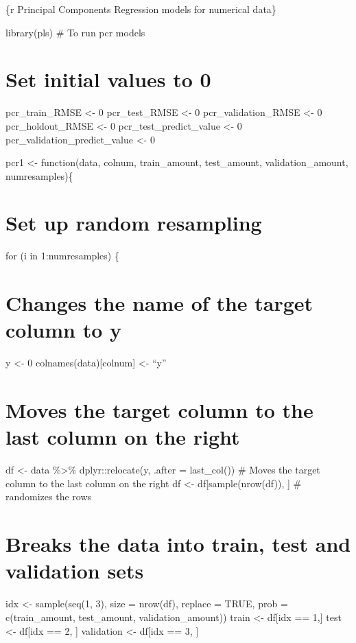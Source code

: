 \documentclass[
]{book}
\begin{document}
\{r Principal Components Regression models for numerical data\}

library(pls) \# To run pcr models

\chapter{Set initial values to 0}\label{set-initial-values-to-0-13}

pcr\_train\_RMSE \textless- 0 pcr\_test\_RMSE \textless- 0 pcr\_validation\_RMSE \textless- 0
pcr\_holdout\_RMSE \textless- 0 pcr\_test\_predict\_value \textless- 0
pcr\_validation\_predict\_value \textless- 0

pcr1 \textless- function(data, colnum, train\_amount, test\_amount,
validation\_amount, numresamples)\{

\chapter{Set up random resampling}\label{set-up-random-resampling-11}

for (i in 1:numresamples) \{

\chapter{Changes the name of the target column to y}\label{changes-the-name-of-the-target-column-to-y-11}

y \textless- 0 colnames(data){[}colnum{]} \textless- ``y''

\chapter{Moves the target column to the last column on the right}\label{moves-the-target-column-to-the-last-column-on-the-right-11}

df \textless- data \%\textgreater\% dplyr::relocate(y, .after = last\_col()) \# Moves the
target column to the last column on the right df \textless-
df{[}sample(nrow(df)), {]} \# randomizes the rows

\chapter{Breaks the data into train, test and validation sets}\label{breaks-the-data-into-train-test-and-validation-sets-11}

idx \textless- sample(seq(1, 3), size = nrow(df), replace = TRUE, prob =
c(train\_amount, test\_amount, validation\_amount)) train \textless- df{[}idx == 1,{]} test \textless- df{[}idx == 2, {]} validation \textless- df{[}idx == 3, {]}
\end{document}

